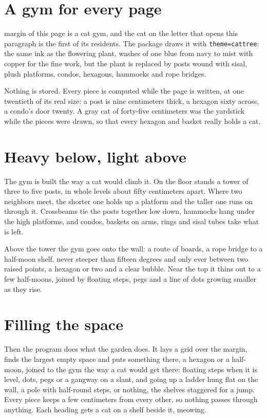 \documentclass[11pt,a4paper]{article}
\newcommand\code[1]{\texttt{\small #1}}
\begin{document}
\section{A gym for every page}

 margin of this page is a cat gym, and the cat on the letter
that opens this paragraph is the first of its residents. The package draws it with
\code{theme=cattree}: the same ink as the flowering plant, washes of one blue from navy to
mist with copper for the fine work, but the plant is replaced by posts wound with sisal,
plush platforms, condos, hexagons, hammocks and rope bridges.

Nothing is stored. Every piece is computed while the page is written, at one twentieth of
its real size: a post is nine centimeters thick, a hexagon sixty across, a condo's door
twenty. A gray cat of forty-five centimeters was the yardstick while the pieces were drawn,
so that every hexagon and basket really holds a cat.

\section{Heavy below, light above}

The gym is built the way a cat would climb it. On the floor stands a tower of three to five
posts, in whole levels about fifty centimeters apart. Where two neighbors meet, the shorter
one holds up a platform and the taller one runs on through it. Crossbeams tie the posts
together low down, hammocks hang under the high platforms, and condos, baskets on arms,
rings and sisal tubes take what is left.

Above the tower the gym goes onto the wall: a route of boards, a rope bridge to a half-moon
shelf, never steeper than fifteen degrees and only ever between two raised points, a
hexagon or two and a clear bubble. Near the top it thins out to a few half-moons, joined by
floating steps, pegs and a line of dots growing smaller as they rise.

\section{Filling the space}

Then the program does what the garden does. It lays a grid over the margin, finds the
largest empty space and puts something there, a hexagon or a half-moon, joined to the gym
the way a cat would get there: floating steps when it is level, dots, pegs or a gangway on a
slant, and going up a ladder hung flat on the wall, a pole with half-round steps, or nothing,
the shelves staggered for a jump. Every piece keeps a few centimeters from every
other, so nothing passes through anything. Each heading gets a cat on a shelf beside it,
meowing.
\end{document}
